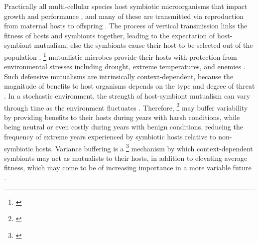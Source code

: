 \documentclass[12pt]{article}
\newcommand{\tom}[2]{{\color{red}{#1}}\footnote{\textit{\color{red}{#2}}}}
\begin{document}
Practically all multi-cellular species host symbiotic microorganisms that impact growth and performance \cite{rodriguez2009fungal,mcfall2013animals}, and many of these are transmitted via reproduction from maternal hosts to offspring \cite{funkhouser2013mom}.
The process of vertical transmission links the fitness of hosts and symbionts together, leading to the expectation of host-symbiont mutualism, else the symbionts cause their host to be selected out of the population \cite{ewald1987transmission,fine1975vectors}. 
\tom{Many}{The rest of this paragraph seems to lose the thread of vertical transmission.} mutualistic microbes provide their hosts with protection from environmental stresses including drought, extreme temperatures, and enemies \cite{russell2006costs,brownlie2009symbiont,kivlin2013fungal,corbin2017heritable,hoadley2019host}. 
Such defensive mutualisms are intrinsically context-dependent, because the magnitude of benefits to host organisms depends on the type and degree of threat \cite{chamberlain2014context}. 
In a stochastic environment, the strength of host-symbiont mutualism can vary through time as the environment fluctuates \cite{jordano1994spatial,billick2003relative}. 
Therefore, \tom{context-dependent symbioses}{I don't think the symbiosis is context-dependent -- the endophytes are always in there. It's the mutualism that is context dependent.} may buffer variability by providing benefits to their hosts during years with harsh conditions, while being neutral or even costly during years with benign conditions, reducing the frequency of extreme years experienced by symbiotic hosts relative to non-symbiotic hosts. 
Variance buffering is a \tom{previously unexplored}{Not just previously unexplored but basically inaccessible because there are no long-term experiments on microbial symbioses -- would be good to make this point somehow.} mechanism by which context-dependent symbionts may act as mutualists to their hosts, in addition to elevating average fitness, which may come to be of increasing importance in a more variable future \cite{rudgers2020climate}. 
\end{document}
